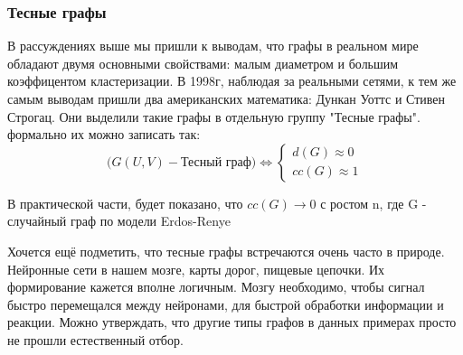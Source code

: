 \subsubsection{Тесные графы}
    В рассуждениях выше мы пришли к выводам, что графы в реальном мире обладают
двумя основными свойствами: малым диаметром и большим коэффицентом кластери\-зации.
В 1998г, наблюдая за реальными сетями, к тем же самым выводам пришли два американских 
математика: Дункан Уоттс и Стивен Строгац. Они выделили такие графы в отдельную группу
"Тесные графы". формально их можно записать так:
\begin{equation*}
    \bigg(G(U, V) - \text{Тесный граф}\bigg) \Leftrightarrow
    \begin{cases}
        d(G) \approx 0 \\
        cc(G) \approx 1
    \end{cases}
\end{equation*}

В практической части, будет показано, что $cc(G) \rightarrow 0$ с ростом n, где G - случайный граф
по модели Erdos-Renye

Хочется ещё подметить, что тесные графы встречаются очень часто в природе.
Ней\-ронные сети в нашем мозге, карты дорог, пищевые цепочки. Их формирование кажется
вполне логичным. Мозгу необходимо, чтобы сигнал быстро перемещался между нейро\-нами,
для быстрой обработки информации и реакции. Можно утверждать, что другие типы графов
в данных примерах просто не прошли естественный отбор.















